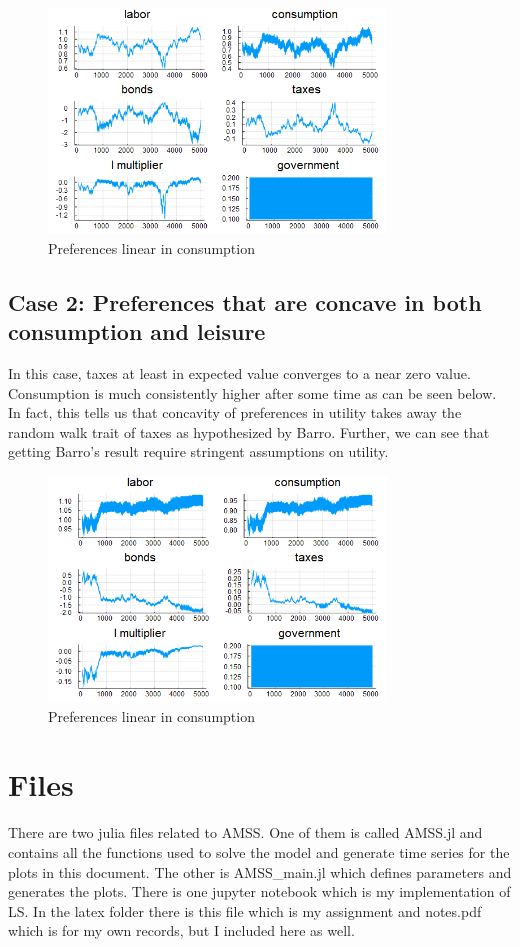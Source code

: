 \documentclass{article} %
\begin{document}
\begin{figure}[h!]
  \centering
  \includegraphics[width = 0.8\textwidth]{../debt_timeseries_linear.png}
    \caption{Preferences linear in consumption}
\end{figure}

\subsection*{Case 2: Preferences that are concave in both consumption and leisure}
In this case, taxes at least in expected value converges to a near zero value. Consumption is much consistently higher after some time as can be seen below. In fact, this tells us that concavity of preferences in utility takes away the random walk trait of taxes as hypothesized by Barro. Further, we can see that getting Barro's result require stringent assumptions on utility. 

\begin{figure}[h!]
  \centering
  \includegraphics[width = 0.8\textwidth]{../debt_timeseries_concave.png}
    \caption{Preferences linear in consumption}
  \end{figure}

  \section*{Files}
  There are two julia files related to AMSS. One of them is called AMSS.jl and contains all the functions used to solve the model and generate time series for the plots in this document. The other is AMSS\_main.jl which defines parameters and generates the plots. There is one jupyter notebook which is my implementation of LS. In the latex folder there is this file which is my assignment and notes.pdf which is for my own records, but I included here as well.  
\end{document}
